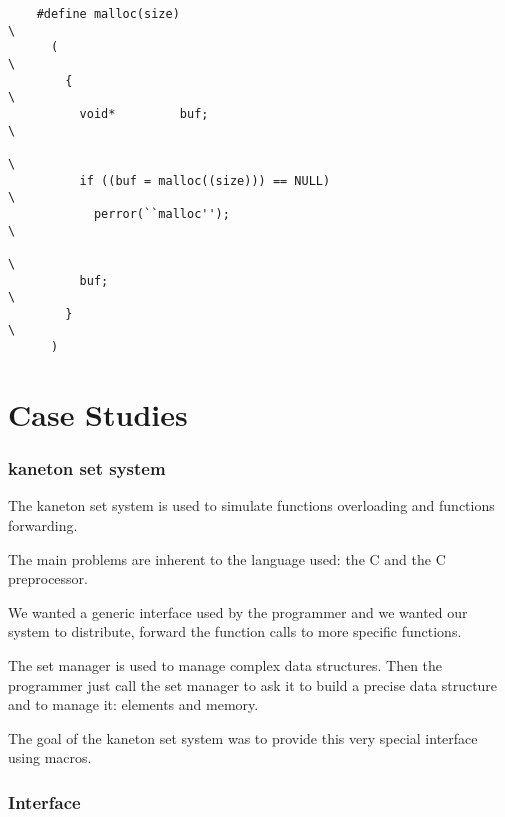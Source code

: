 {\begin{frame}[containsverbatim]
\begin{verbatim}
    #define malloc(size)                                                \
      (                                                                 \
        {                                                               \
          void*         buf;                                            \
                                                                        \
          if ((buf = malloc((size))) == NULL)                           \
            perror(``malloc'');                                         \
                                                                        \
          buf;                                                          \
        }                                                               \
      )
  \end{verbatim}
\end{frame}

%
%

\section{Case Studies}


\begin{frame}
  \frametitle{kaneton set system}

  The kaneton set system is used to simulate functions overloading and
  functions forwarding.

  \nl

  The main problems are inherent to the language used: the C and the C
  preprocessor.

  \nl

  We wanted a generic interface used by the programmer and we wanted our
  system to distribute, forward the function calls to more specific
  functions.

  \nl

  The set manager is used to manage complex data structures. Then the
  programmer just call the set manager to ask it to build a precise data
  structure and to manage it: elements and memory.

  \nl

  The goal of the kaneton set system was to provide this very special
  interface using macros.
\end{frame}


\begin{frame}[containsverbatim]
  \frametitle{Interface}


\end{frame}}
